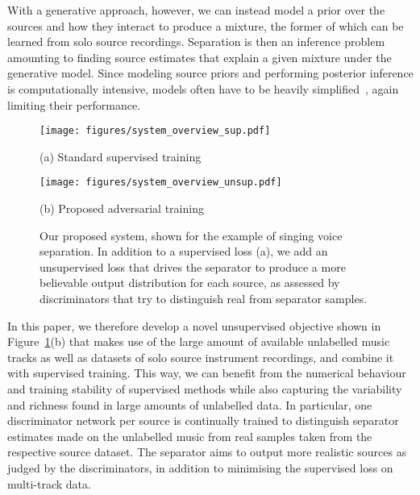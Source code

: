 \documentclass{article}
\begin{document}
With a generative approach, however, we can instead model a prior over the sources and how they interact to produce a mixture, the former of which can be learned from solo source recordings.
Separation is then an inference problem amounting to finding source estimates that explain a given mixture under the generative model.
Since modeling source priors and performing posterior inference is computationally intensive, models often have to be heavily simplified~\cite{Fevotte2007}, again limiting their performance.

\begin{figure}[t]
\begin{minipage}[t]{0.48\textwidth}
  \centering
  \centerline{\texttt{[image: figures/system\_overview\_sup.pdf]}}
  \centerline{(a) Standard supervised training}\medskip
\end{minipage}
\begin{minipage}[b]{0.48\textwidth}
  \centering
  \centerline{\texttt{[image: figures/system\_overview\_unsup.pdf]}}
  \centerline{(b) Proposed adversarial training}\medskip
\end{minipage}
\vspace{-0.4cm}
\caption{Our proposed system, shown for the example of singing voice separation. In addition to a supervised loss (a), we add an unsupervised loss that drives the separator to produce a more believable output distribution for each source, as assessed by discriminators that try to distinguish real from separator samples.}
\label{fig:res}
\end{figure}

In this paper, we therefore develop a novel unsupervised objective shown in Figure~\ref{fig:res}(b) that makes use of the large amount of available unlabelled music tracks as well as datasets of solo source instrument recordings, and combine it with supervised training.
This way, we can benefit from the numerical behaviour and training stability of supervised methods while also capturing the variability and richness found in large amounts of unlabelled data.
In particular, one discriminator network per source is continually trained to distinguish separator estimates made on the unlabelled music from real samples taken from the respective source dataset.
The separator aims to output more realistic sources as judged by the discriminators, in addition to minimising the supervised loss on multi-track data.
\end{document}
